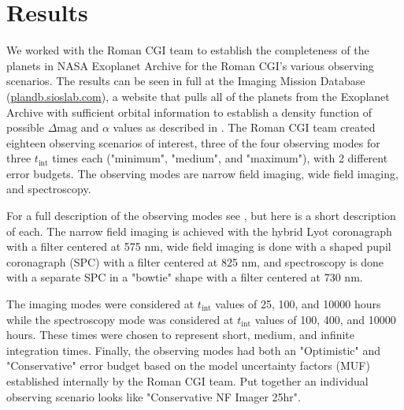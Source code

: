 \section{Results}%
\label{sec:coupling_results}

We worked with the Roman CGI team to establish the completeness of the planets
in NASA Exoplanet Archive \citep{akesonNASAExoplanet2013} for the Roman CGI's
various observing scenarios. The results can be seen in full at the Imaging Mission Database
(\url{plandb.sioslab.com}), a website that pulls all of the planets from the
Exoplanet Archive with sufficient orbital information to establish a density
function of possible $\Delta\textrm{mag}$ and $\alpha$ values as described in
\citet{savranskyExplorationDynamical2019}. The Roman CGI team created eighteen
observing scenarios of interest, three of the four observing modes for three
$t_\textrm{int}$ times each ("minimum", "medium", and "maximum"), with 2
different error budgets. The observing modes are narrow field imaging, wide
field imaging, and spectroscopy.

For a full description of the observing modes see \citet{kasdinNancyGrace2020},
but here is a short description of each. The narrow field imaging is achieved
with the hybrid Lyot coronagraph with a filter centered at 575 nm, wide field
imaging is done with a shaped pupil coronagraph (SPC) with a filter centered at
825 nm, and spectroscopy is done with a separate SPC in a "bowtie" shape with a
filter centered at 730 nm. 

The imaging modes were considered at $t_\textrm{int}$ values of 25, 100, and
10000 hours while the spectroscopy mode was considered at $t_\textrm{int}$
values of 100, 400, and 10000 hours. These times were chosen to represent
short, medium, and infinite integration times. Finally, the observing modes had
both an "Optimistic" and "Conservative" error budget based on the model
uncertainty factors (MUF) established internally by the Roman CGI team. Put together
an individual observing scenario looks like "Conservative NF Imager 25hr".

